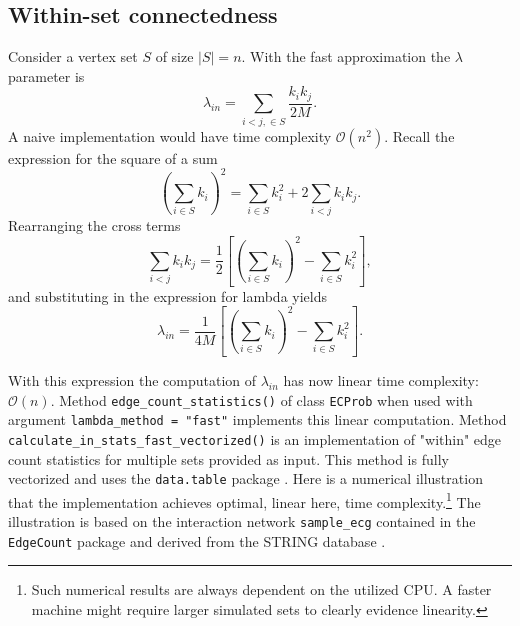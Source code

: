 \documentclass{article}\usepackage[]{graphicx}\usepackage[]{xcolor}
\begin{document}
\subsection{Within-set connectedness}

Consider a vertex set $S$ of size $\left| S \right| = n$. With the fast approximation the $\lambda$ parameter is
\begin{equation}
\lambda_{in} = \sum_{i < j, \in S} \frac{k_i k_j}{2M}.
\end{equation}
A naive implementation would have time complexity $\mathcal{O} \left( n^2 \right)$. Recall the expression for the square of a sum
\begin{equation}
\left( \sum_{i \in S} k_i \right)^2 = \sum_{i \in S} k_i^2 + 2 \sum_{i < j} k_i k_j.
\end{equation}
Rearranging the cross terms
\begin{equation}
\sum_{i < j} k_i k_j = \frac{1}{2} \left[ \left( \sum_{i \in S} k_i \right)^2 - \sum_{i \in S} k_i^2 \right],
\end{equation}
and substituting in the expression for lambda yields
\begin{equation}
\lambda_{in} = \frac{1}{4M} \left[ \left( \sum_{i \in S} k_i \right)^2 - \sum_{i \in S} k_i^2 \right].
\end{equation}

With this expression the computation of $\lambda_{in}$ has now linear time complexity: $\mathcal{O}\left( n \right)$. Method \texttt{edge\_count\_statistics()} of class \texttt{ECProb} when used with argument \texttt{lambda\_method = "fast"} implements this linear computation. Method \texttt{calculate\_in\_stats\_fast\_vectorized()} is an implementation of "within" edge count statistics for multiple sets provided as input. This method is fully vectorized and uses the \texttt{data.table} package \cite{datatable2025}. Here is a numerical illustration that the implementation achieves optimal, linear here, time complexity.\footnote{Such numerical results are always dependent on the utilized CPU. A faster machine might require larger simulated sets to clearly evidence linearity.} The illustration is based on the interaction network \texttt{sample\_ecg} contained in the \texttt{EdgeCount} package and derived from the STRING database \cite{szklarczyk2023, sample_ecg_data}.
\end{document}
